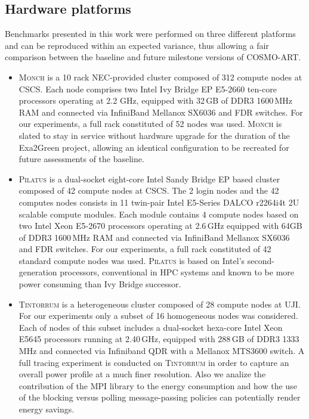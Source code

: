\subsection{Hardware platforms}
\label{subsec:3.1}

Benchmarks presented  in this work  were performed on  three different
platforms  and can  be reproduced  within an  expected  variance, thus
allowing a  fair comparison between the baseline  and future milestone
versions of \textsc{COSMO-ART}.

\begin{itemize}
\item \textsc{Monch} is a 10 rack NEC-provided cluster composed
  of 312 compute  nodes %
   at CSCS. Each
  node comprises two Intel Ivy Bridge EP  E5-2660 ten-core processors
  operating at  2.2 GHz, equipped with 32\,GB of DDR3 1600\,MHz  RAM and connected  via InfiniBand Mellanox  SX6036 and FDR switches. For our  experiments, 
  a full rack constituted of 52 nodes was used. \textsc{Monch} is  slated to stay
  in  service  without  hardware  upgrade  for  the  duration  of  the
  Exa2Green  project,  allowing   an  identical  configuration  to  be
  recreated for future assessments of the baseline.\\

\item \textsc{Pilatus} is a dual-socket eight-core Intel Sandy
  Bridge EP based cluster composed of 42 compute nodes %
  at  CSCS.  The 2 login  nodes and
  the 42 computes nodes consists in 11 twin-pair Intel E5-Series DALCO
  r2264i4t 2U scalable compute modules. Each module contains 4 compute
  nodes based  on two Intel Xeon E5-2670 processors operating  at 2.6\,GHz equipped with 64GB of DDR3 1600\,MHz RAM and connected  via InfiniBand Mellanox SX6036 and FDR switches. 
  For our  experiments, a  full rack constituted  of 42 standard  compute nodes
  was  used. \textsc{Pilatus}  is based  on  Intel's second-generation
  processors, conventional in  HPC systems and known to  be more power
  consuming than Ivy Bridge successor.\\

\item \textsc{Tintorrum} is  a heterogeneous cluster composed of
  28 compute nodes at UJI. For our  experiments only a subset of 16 homogeneous nodes was considered. Each of nodes of this subset includes a dual-socket hexa-core Intel Xeon E5645 processors 
  running at 2.40\,GHz, equipped with 288\,GB  of DDR3 1333\,MHz and connected via Infiniband QDR with a Mellanox MTS3600 switch. A  full tracing  experiment is  conducted on
  \textsc{Tintorrum} in order to  capture an overall  power profile at a much
  finer resolution. Also we analize the contribution of the MPI library
  to the energy consumption and how the use of the blocking versus polling
  message-passing policies can potentially render energy savings.
\end{itemize}

